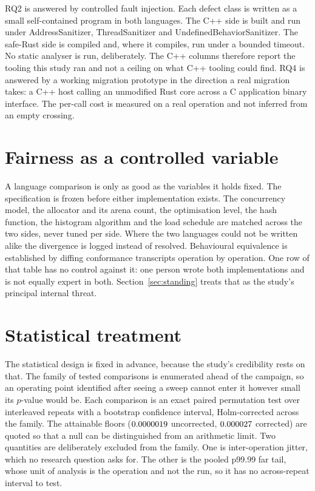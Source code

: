 \documentclass[english,oneside,a4paper,censored,csm,software-track-2020]{HYthesisML}
\begin{document}
RQ2 is answered by controlled fault injection. Each defect class is written as a small
self-contained program in both languages. The C++ side is built and run under
AddressSanitizer, ThreadSanitizer and UndefinedBehaviorSanitizer. The safe-Rust side is
compiled and, where it compiles, run under a bounded timeout. No static analyser is run,
deliberately. The C++ columns therefore report the tooling this study ran and not a ceiling on
what C++ tooling could find. RQ4 is answered by a working migration prototype in the direction
a real migration takes: a C++ host calling an unmodified Rust core across a C application
binary interface. The per-call cost is measured on a real operation and not inferred from an
empty crossing.

\section{Fairness as a controlled variable}\label{sec:controlsbrief}
A language comparison is only as good as the variables it holds fixed. The specification is
frozen before either implementation exists. The concurrency model, the allocator and its arena
count, the optimisation level, the hash function, the histogram algorithm and the load schedule
are matched across the two sides, never tuned per side. Where the two languages could not be
written alike the divergence is logged instead of resolved. Behavioural equivalence is
established by diffing conformance transcripts operation by operation. One row of that table
has no control against it: one person wrote both implementations and is not equally expert in
both. Section~\ref{sec:standing} treats that as the study's principal internal threat.

\section{Statistical treatment}\label{sec:statsbrief}
The statistical design is fixed in advance, because the study's credibility rests on that.
The family of tested comparisons is enumerated ahead of the campaign, so an operating point
identified after seeing a sweep cannot enter it however small its $p$-value would be. Each
comparison is an exact paired permutation test over \NRepeats{} interleaved repeats with a
bootstrap confidence interval, Holm-corrected across the family. The attainable floors
($0.0000019$ uncorrected, $0.000027$ corrected) are quoted so that a null can be
distinguished from an arithmetic limit. Two quantities are deliberately excluded from the
family. One is inter-operation jitter, which no research question asks for. The other is the
pooled p99.99 far tail, whose unit of analysis is the operation and not the run, so it has no
across-repeat interval to test.
\end{document}
